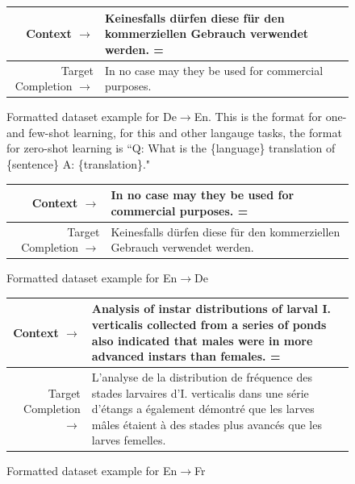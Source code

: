 \begin{figure} { \tt \footnotesize \begin{tabularx}{\linewidth}{r X} \toprule Context $\to$ & Keinesfalls d\"urfen diese f\"ur den kommerziellen Gebrauch verwendet werden. = \\ 
 \midrule
Target Completion $\to$ & In no case may they be used for commercial purposes. \\
\bottomrule \end{tabularx} }  \caption{Formatted dataset example for De$\to$En.  This is the format for one- and few-shot learning, for this and other langauge tasks, the format for zero-shot learning is ``Q: What is the \{language\} translation of \{sentence\} A: \{translation\}." }  \label{eval:De_En}  \end{figure}%
\begin{figure} { \tt \footnotesize \begin{tabularx}{\linewidth}{r X} \toprule Context $\to$ & In no case may they be used for commercial purposes. = \\ 
 \midrule Target Completion $\to$ & Keinesfalls d\"urfen diese f\"ur den kommerziellen Gebrauch verwendet werden. \\
\bottomrule \end{tabularx} }  \caption{Formatted dataset example for En$\to$De}  \label{eval:En_De}  \end{figure}%
\begin{figure} { \tt \footnotesize \begin{tabularx}{\linewidth}{r X} \toprule Context $\to$ & Analysis of instar distributions of larval I. verticalis collected from a series of ponds also indicated that males were in more advanced instars than females. = \\ 
 \midrule Target Completion $\to$ & L'analyse de la distribution de fr\'equence des stades larvaires d'I. verticalis dans une s\'erie d'\'etangs a \'egalement d\'emontr\'e que les larves m\^ales \'etaient \`a des stades plus avanc\'es que les larves femelles. \\
\bottomrule \end{tabularx} }  \caption{Formatted dataset example for En$\to$Fr}  \label{eval:En_Fr}  \end{figure}%

